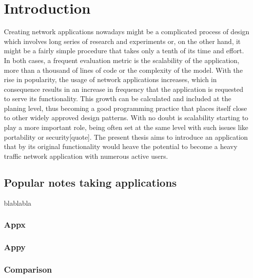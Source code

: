\chapter{Introduction}
\label{sec:Introduction}
Creating network applications nowadays might be a complicated process of design which involves long series of research and experiments or, on the other hand, it might be a fairly simple procedure that takes only a tenth of its time and effort. In both cases, a frequent evaluation metric is the scalability of the application, more than a thousand of lines of code or the complexity of the model. With the rise in popularity, the usage of network applications increases, which in consequence results in an increase in frequency that the application is requested to serve its functionality. This growth can be calculated and included at the planing level, thus becoming a good programming practice that places itself close to other widely approved design patterns. With no doubt is scalability starting to play a more important role, being often set at the same level with such issues like portability or security[quote]. The present thesis aims to introduce an application that by its original functionality would heave the potential to become a heavy traffic network application with numerous active users.

\section{Popular notes taking applications}\label{sec:popular_apps} 
blablabla
\subsection{Appx}\label{subsec:x} 
\subsection{Appy}
\subsection{Comparison}
